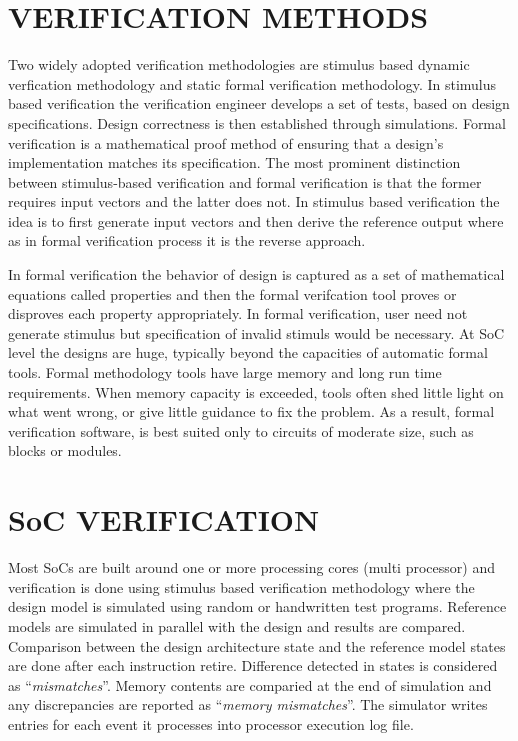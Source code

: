 \section{VERIFICATION METHODS}
Two widely adopted verification methodologies are stimulus based dynamic verfication methodology and static formal verification methodology. In stimulus based verification the verification engineer develops a set of tests, based on design specifications. Design correctness is then established through simulations. Formal verification is a mathematical proof method of ensuring that a design's implementation matches its specification. The most prominent distinction between stimulus-based verification and formal verification is that the former requires input vectors and the latter does not. In stimulus based verification the idea is to first generate input vectors and then derive the reference output where as in formal verification process it is the reverse approach.

In formal verification the behavior of design is captured as a set of mathematical equations called properties and then the formal verifcation tool proves or disproves each property appropriately. In formal verification, user need not generate stimulus but specification of invalid stimuls would be necessary.  At SoC level the designs are huge, typically beyond the capacities of automatic formal tools. Formal methodology tools have large memory and long run time requirements. When memory capacity is exceeded, tools often shed little light on what went wrong, or give little guidance to fix the problem. As a result, formal verification software, is best suited only to circuits of moderate size, such as blocks or modules. 

\section{SoC VERIFICATION}
Most SoCs are built around one or more processing cores (multi processor) and verification is done using stimulus based verification methodology where the design model is simulated using random or handwritten test programs. Reference models are simulated in parallel with the design and results are compared.  Comparison between the design architecture state and the reference model states are done after each instruction retire. Difference detected in states is considered as ``{\it mismatches}''. Memory contents are comparied at the end of simulation and any discrepancies are reported as ``{\it memory mismatches}''.  The simulator writes entries for each event it processes into processor execution log file.

